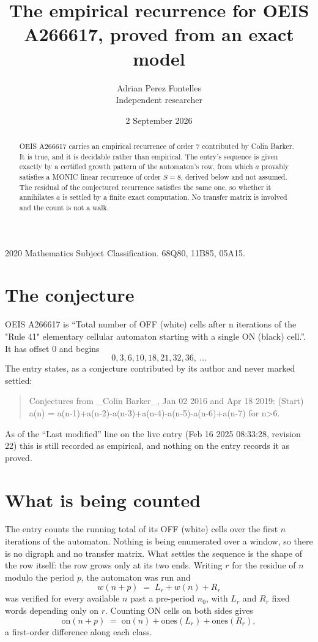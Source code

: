 \documentclass[11pt,a4paper]{article}
\title{The empirical recurrence for OEIS A266617, proved from an exact model}
\author{Adrian Perez Fontelles\\ \small Independent researcher}
\date{2 September 2026}
\theoremstyle{plain}
\theoremstyle{definition}
\begin{document}
\maketitle

\begin{abstract}
OEIS A266617 carries an empirical recurrence of order $7$ contributed by Colin Barker. It is true, and it is
decidable rather than empirical. The entry's sequence is given exactly by a certified growth pattern of the automaton's row, from
which $a$ provably satisfies a MONIC linear recurrence of order $S=8$, derived below and not
assumed. The residual of the conjectured recurrence satisfies the same one, so whether it
annihilates $a$ is settled by a finite exact computation. No transfer matrix is involved and
the count is not a walk.
\end{abstract}

\noindent\small 2020 Mathematics Subject Classification. 68Q80, 11B85, 05A15.\normalsize

\section{The conjecture}

OEIS A266617 is ``Total number of OFF (white) cells after n iterations of the "Rule 41" elementary cellular automaton starting with a single ON (black) cell.''. It has offset $0$ and begins
\[
0, 3, 6, 10, 18, 21, 32, 36,\ \dots
\]
The entry states, as a conjecture contributed by its author and never marked settled:
\begin{quote}
Conjectures from \_Colin Barker\_, Jan 02 2016 and Apr 18 2019: (Start) a(n) = a(n-1)+a(n-2)-a(n-3)+a(n-4)-a(n-5)-a(n-6)+a(n-7) for n>6.
\end{quote}
As of the ``Last modified'' line on the live entry (Feb 16 2025 08:33:28, revision 22)
this is still recorded as empirical, and nothing on the entry records it as proved.

\section{What is being counted}

The entry counts the running total of its OFF (white) cells over the first $n$ iterations of the automaton. Nothing is being enumerated over a window, so there is
no digraph and no transfer matrix. What settles the sequence is the shape of the row itself:
the row grows only at its two ends. Writing
$r$ for the residue of $n$ modulo the period $p$, the automaton was run and
\[
w(n+p)\;=\;L_r + w(n) + R_r
\]
was verified for every available $n$ past a
pre-period $n_0$, with $L_r$ and $R_r$ fixed words depending only on $r$. Counting ON cells on
both sides gives
\[
\mathrm{on}(n+p)\;=\;\mathrm{on}(n)+\mathrm{ones}(L_r)+\mathrm{ones}(R_r),
\]
a first-order difference along each class.
\end{document}
